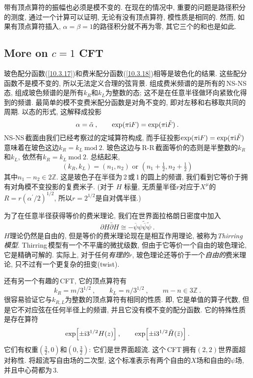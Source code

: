 带有顶点算符的振幅也必须是模不变的. 在现在的情况中, 重要的问题是路径积分的测度, 通过一个计算可以证明, 无论有没有顶点算符, 模性质是相同的. 然而, 如果有顶点算符插入, $\alpha=\beta=1 $的路径积分就不再为零, 其它三个的和也是如此.



\subsection*{More on $c=1$ CFT}

玻色配分函数(\ref{10.3.17})和费米配分函数(\ref{10.3.18})相等是玻色化的结果. 这些配分函数不是模不变的, 所以无法定义合理的弦背景. 组成费米频谱的是所有的\,NS-NS\,态,  组成玻色频谱的是所有$ k_{R} $和$ k_{L} $为整数的态; 这不是在任意半径做环向紧致化得到的频谱. 最简单的模不变费米配分函数是对角不变的, 即对左移和右移取共同的周期. 以态的形式, 这解释成投影
\begin{equation}
    \alpha=\tilde{\alpha}\:, \qquad \exp(\pi\mathrm{i} F)=\exp(\pi\mathrm{i}\tilde{F})\:.\label{10.7.17}
\end{equation}
NS-NS\,截面由我们已经考察过的定域算符构成, 而手征投影$ \exp(\pi\mathrm{i} F)=\exp(\pi\mathrm{i}\tilde{F}) $意味着在玻色这边$ k_{R}=k_{L}\:\mathrm{mod}\: 2$. 玻色这边与\,R-R\,截面等价的态则是半整数的$ k_{R} $和$ k_{L}$, 依然有$ k_{R}=k_{L}\:\mathrm{mod}\: 2$. 总结起来,
\begin{equation}
    (k_{R},k_{L})=(n_{1},n_{2})\text{ or }(n_{1}+\tfrac{1}{2},n_{2}+\tfrac{1}{2}) \label{10.7.18}
\end{equation}
其中$ n_{1}-n_{2}\in 2\mathds{Z}$. 这是玻色子在半径为\,2\,或\,1\,的圆上的频谱, 我们看到它等价于拥有对角模不变投影的复费米子. (对于 $H$ 标量, 无质量半径$ r $对应于$ X^{\mu} $的$ R=r(\alpha^{\prime}/2)^{1/2}$, 所以$ r=2^{1/2} $是自对偶半径.)


为了在任意半径获得等价的费米理论, 我们在世界面拉格朗日密度中加入
\begin{equation}
    \partial H \bar{\partial} H \cong -\overline{\psi}\psi\tilde{\overline{\psi}} \tilde{\psi}\:. \label{10.7.19}
\end{equation}
$H $理论仍然是自由的, 但是等价的费米理论现在是相互作用理论, 被称为{\emph{Thirring }\emph{模型}}. Thirring\,模型有一个不平庸的微扰级数, 但由于它等价一个自由的玻色理论, 它是精确可解的. 实际上, 对于任何{\emph{有理的}}$ r$, 玻色理论还等价于一个{\emph{自由的}}费米理论, 只不过有一个更复杂的扭变(twist).

还有另一个有趣的\,CFT, 它的顶点算符有
\begin{equation}
    k_{R} = m/3^{1/2}\:,\qquad k_{L}=n/3^{1/2} \:,\qquad m-n\in 3\mathds{Z} \:. \label{10.7.20}
\end{equation}
很容易验证它与$ k_{R,L} $为整数的顶点算符有相同的性质. 即, 它是单值的算子代数, 但是它不对应弦在任何半径上的频谱, 并且它没有模不变的配分函数. 它的特殊性质是存在算符
\begin{equation}
    \exp\Bigl[\pm\mathrm{i} 3^{1/2}H(z)\Bigr]\:, \qquad \exp\Bigl[\pm\mathrm{i} 3^{1/2}\tilde{H}(\bar{z})\Bigr]\:.\label{10.7.21}
\end{equation}
它们有权重$(\frac{3}{2},0)$和$(0,\frac{3}{2})$: 它们是世界面超流. 这个\,CFT\,拥有$(2,2)$世界面超对称性. 将超流写自由场的二次型, 这个标准表示有两个自由的$ X $场和自由的$ \psi $场, 并且中心荷都为\,3.

